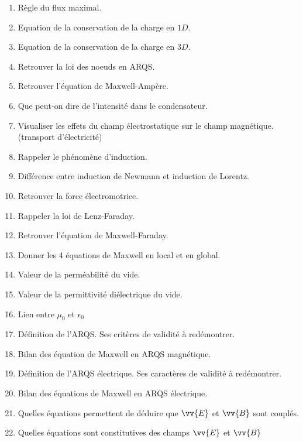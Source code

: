 \documentclass[a4paper, 11pt, hidelinks]{article}
\begin{document}
\begin{enumerate}
    \item Règle du flux maximal. \cite{Chapitre12}
    \item Equation de la conservation de la charge en $1D$. \cite{Chapitre13}
    \item Equation de la conservation de la charge en $3D$. \cite{Chapitre13}
    \item Retrouver la loi des noeuds en ARQS. \cite{Chapitre13}
    \item Retrouver l'équation de Maxwell-Ampère. \cite{Chapitre13}
    \item Que peut-on dire de l'intensité dans le condensateur. \cite{Chapitre13}
    \item Visualiser les effets du champ électrostatique sur le champ magnétique. (transport d'électricité) \cite{Chapitre13}
    \item Rappeler le phénomène d'induction. \cite{Chapitre13}
    \item Différence entre induction de Newmann et induction de Lorentz. \cite{Chapitre13}
    \item Retrouver la force électromotrice. \cite{Chapitre13}
    \item Rappeler la loi de Lenz-Faraday. \cite{Chapitre13}
    \item Retrouver l'équation de Maxwell-Faraday. \cite{Chapitre13}
    \item Donner les 4 équations de Maxwell en local et en global. \cite{Chapitre13}
    \item Valeur de la perméabilité du vide. \cite{Chapitre13}
    \item Valeur de la permittivité diélectrique du vide. \cite{Chapitre13}
    \item Lien entre $\mu_0$ et $\epsilon_0$ \cite{Chapitre13}
    \item Définition de l'ARQS. Ses critères de validité à redémontrer. \cite{Chapitre13}
    \item Bilan des équation de Maxwell en ARQS magnétique. \cite{Chapitre13}
    \item Définition de l'ARQS électrique. Ses caractères de validité à redémontrer. \cite{Chapitre13}
    \item Bilan des équations de Maxwell en ARQS électrique. \cite{Chapitre13}
    \item Quelles équations permettent de déduire que $\vv{E}$ et $\vv{B}$ sont couplés. \cite{Chapitre13}
    \item Quelles équations sont constitutives des champs $\vv{E}$ et $\vv{B}$ \cite{Chapitre13}

\end{enumerate}
\end{document}
